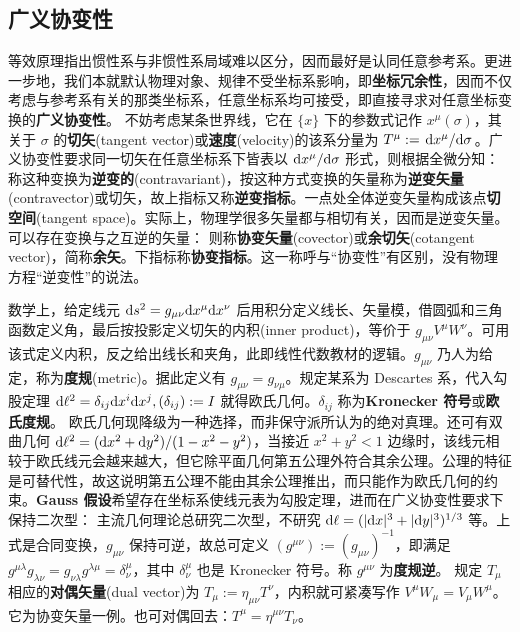 \subsection{广义协变性}

等效原理指出惯性系与非惯性系局域难以区分，因而最好是认同任意参考系。更进一步地，我们本就默认物理对象、规律不受坐标系影响，即\textbf{坐标冗余性}，因而不仅考虑与参考系有关的那类坐标系，任意坐标系均可接受，即直接寻求对任意坐标变换的\textbf{广义协变性}。
不妨考虑某条世界线，它在 $\{x\}$ 下的参数式记作 $x^\mu(\sigma)$，其关于 $\sigma$ 的\textbf{切矢}(tangent vector)或\textbf{速度}(velocity)的该系分量为 $T^\mu:=\dv*{x^\mu}{\sigma}$。广义协变性要求同一切矢在任意坐标系下皆表以 $\dd x^\mu/\dd\sigma$ 形式，则根据全微分知：
称这种变换为\textbf{逆变的}(contravariant)，按这种方式变换的矢量称为\textbf{逆变矢量}(contravector)或切矢，故上指标又称\textbf{逆变指标}。一点处全体逆变矢量构成该点\textbf{切空间}(tangent space)。实际上，物理学很多矢量都与相切有关，因而是逆变矢量。可以存在变换与之互逆的矢量：
则称\textbf{协变矢量}(covector)或\textbf{余切矢}(cotangent vector)，简称\textbf{余矢}。下指标称\textbf{协变指标}。这一称呼与“协变性”有区别，没有物理方程“逆变性”的说法。

数学上，给定线元 $\dd s^2=g_{\mu\nu}\dd x^\mu\dd x^\nu$ 后用积分定义线长、矢量模，借圆弧和三角函数定义角，最后按投影定义切矢的内积(inner product)，等价于 $g_{\mu\nu}V^\mu W^\nu$。可用该式定义内积，反之给出线长和夹角，此即线性代数教材的逻辑。$g_{\mu\nu}$ 乃人为给定，称为\textbf{度规}(metric)。据此定义有 $g_{\mu\nu}=g_{\nu\mu}$。规定某系为 Descartes 系，代入勾股定理 $\dd\ell^2=\delta_{ij}\dd x^i\dd x^j,({\delta}_{ij}):=I$ 就得欧氏几何。$\delta_{ij}$ 称为\textbf{Kronecker 符号}或\textbf{欧氏度规}。
欧氏几何现降级为一种选择，而非保守派所认为的绝对真理。还可有双曲几何 $\dd\ell^2=(\dd x^2+\dd y^2)/(1-x^2-y^2)$，当接近 $x^2+y^2<1$ 边缘时，该线元相较于欧氏线元会越来越大，但它除平面几何第五公理外符合其余公理。公理的特征是可替代性，故这说明第五公理不能由其余公理推出，而只能作为欧氏几何的约束。\textbf{Gauss 假设}希望存在坐标系使线元表为勾股定理，进而在广义协变性要求下保持二次型：
主流几何理论总研究二次型，不研究 $\dd\ell=(|\dd x|^3+|\dd y|^3)^{1/3}$ 等。上式是合同变换，$g_{\mu\nu}$ 保持可逆，故总可定义 $(g^{\mu\nu}):=(g_{\mu\nu})^{-1}$，即满足 $g^{\mu \lambda} g_{\lambda\nu}=g_{\nu\lambda}g^{\lambda\mu}=\delta^\mu_\nu$，其中 $\delta^\mu_\nu$ 也是 Kronecker 符号。称 $g^{\mu\nu}$ 为\textbf{度规逆}。
规定 $T_\mu$ 相应的\textbf{对偶矢量}(dual vector)为 $T_\mu:=\eta_{\mu\nu}T^\nu$，内积就可紧凑写作 $V^\mu W_\mu=V_\mu W^\mu$。它为协变矢量一例。也可对偶回去：$T^\mu=\eta^{\mu\nu}T_\nu$。

